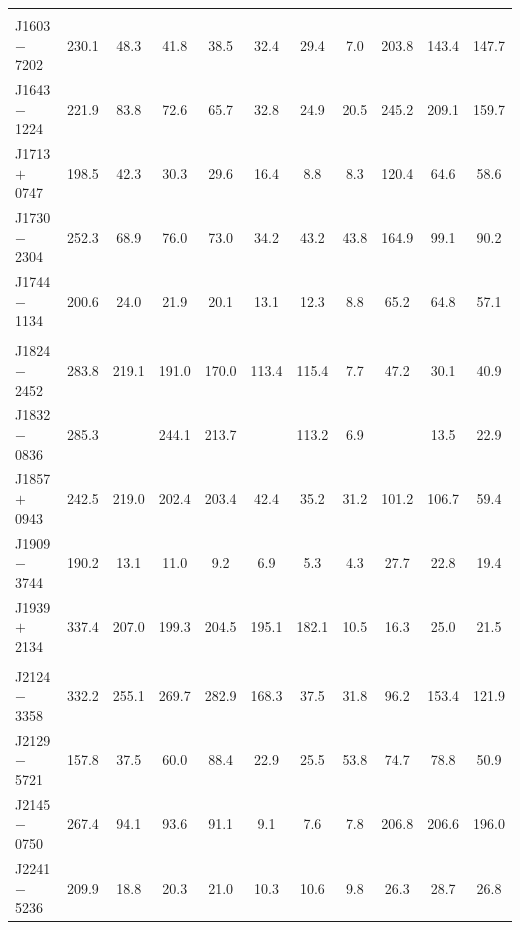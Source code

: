 \documentclass[useAMS,usenatbib]{mn2e}
\begin{document}
\begin{table}
\begin{center}
\begin{tabular}{lcccccccccc}
	               &        &      &   &   &   &   &              \\
J1603$-$7202     &  230.1      & 48.3      & 41.8   & 38.5   & 32.4  & 29.4  & 7.0     &  203.8&  143.4  & 147.7  \\
J1643$-$1224     &  221.9      & 83.8      & 72.6   & 65.7   & 32.8  & 24.9  & 20.5    &  245.2&  209.1  & 159.7   \\
J1713$+$0747     &  198.5      & 42.3      & 30.3   & 29.6   & 16.4  & 8.8   & 8.3     &  120.4&  64.6   & 58.6   \\
J1730$-$2304     &  252.3      & 68.9      & 76.0   & 73.0   & 34.2  & 43.2  & 43.8    &  164.9&  99.1   & 90.2    \\
J1744$-$1134     &  200.6      & 24.0      & 21.9   & 20.1   & 13.1  & 12.3  & 8.8     &  65.2 &  64.8   & 57.1   \\
	               &        &      &   &   &   &   &              \\
J1824$-$2452     &  283.8      & 219.1     & 191.0  & 170.0  & 113.4 &115.4   &7.7     &  47.2 &  30.1   & 40.9   \\
J1832$-$0836     &  285.3      &           & 244.1  & 213.7  &       & 113.2  &  6.9   &       &  13.5   & 22.9 \\
J1857$+$0943     &  242.5      & 219.0     & 202.4  & 203.4  & 42.4  & 35.2  & 31.2    &  101.2&  106.7  & 59.4  \\
J1909$-$3744     &  190.2      & 13.1      & 11.0   & 9.2    & 6.9  &  5.3   & 4.3     &  27.7 &  22.8   & 19.4 \\
J1939$+$2134     &  337.4      & 207.0     & 199.3  & 204.5  & 195.1  &182.1   & 10.5  &  16.3 &  25.0   & 21.5     \\
	               &        &      &   &   &   &   &              \\
J2124$-$3358     &  332.2      & 255.1     & 269.7  & 282.9  & 168.3 & 37.5  & 31.8    &  96.2 &  153.4  & 121.9   \\
J2129$-$5721     &  157.8      & 37.5      & 60.0   & 88.4   & 22.9  & 25.5  & 53.8    &  74.7 &  78.8   & 50.9    \\
J2145$-$0750     &  267.4      & 94.1      & 93.6   & 91.1   & 9.1   & 7.6   & 7.8     &  206.8&  206.6  & 196.0  \\
J2241$-$5236     &  209.9      & 18.8      & 20.3   & 21.0   & 10.3  & 10.6  & 9.8     &  26.3 &  28.7   & 26.8   \\
\hline
\end{tabular}
\end{center}
\end{table}
\end{document}
